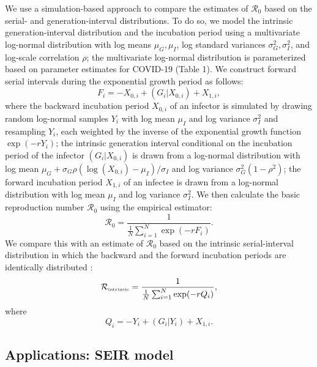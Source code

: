 \documentclass[12pt]{article}
\newcommand{\Rx}[1]{\ensuremath{{\mathcal R}_{#1}}\xspace}
\newcommand{\Ro}{\Rx{0}}
\newcommand{\Rintrinsic}{\ensuremath{{\mathcal R}_{\textrm{\tiny intrinsic}}}\xspace}
\begin{document}
We use a simulation-based approach to compare the estimates of \Ro based on the serial- and generation-interval distributions. 
To do so, we model the intrinsic generation-interval distribution and the incubation period using a multivariate log-normal distribution with log means $\mu_G, \mu_I$, log standard variances $\sigma_G^2, \sigma_I^2$, and log-scale correlation $\rho$;
the multivariate log-normal distribution is parameterized based on parameter estimates for COVID-19 (Table 1).
We construct forward serial intervals during the exponential growth period as follows:
\begin{equation}
F_i = -X_{0,i} + (G_i|X_{0,i}) + X_{1,i},
\end{equation}
where the backward incubation period $X_{0,i}$ of an infector is simulated by drawing random log-normal samples $Y_i$ with log mean $\mu_I$ and log variance $\sigma_I^2$ and resampling $Y_i$, each weighted by the inverse of the exponential growth function $\exp(-rY_i)$;
the intrinsic generation interval conditional on the incubation period of the infector $(G_i|X_{0,i})$ is drawn from a log-normal distribution with log mean $\mu_G + \sigma_G \rho (\log(X_{0,i}) - \mu_I)/\sigma_I$ and log variance $\sigma_G^2 (1-\rho^2)$;
the forward incubation period $X_{1,i}$ of an infectee is drawn from a log-normal distribution with log mean $\mu_I$ and log variance $\sigma_I^2$.
We then calculate the basic reproduction number \Ro using the empirical estimator:
\begin{equation}
\Ro = \frac{1}{\frac{1}{N}\sum_{i=1}^N \exp(- r F_i)}.
\end{equation}
We compare this with an estimate of \Ro based on the intrinsic serial-interval distribution in which the backward and the forward incubation periods are identically distributed \citep{svensson2007note,klinkenberg2011correlation,champredon2018equivalence, britton2019estimation}:
\begin{equation}
  \Rintrinsic = \frac{1}{\frac{1}{N}\sum_{i=1}^N \exp(- r Q_i)},
\end{equation}
where
\begin{equation}
Q_i = -Y_i + (G_i|Y_i) + X_{1,i}.
\end{equation}

\subsection{Applications: SEIR model}
\end{document}
